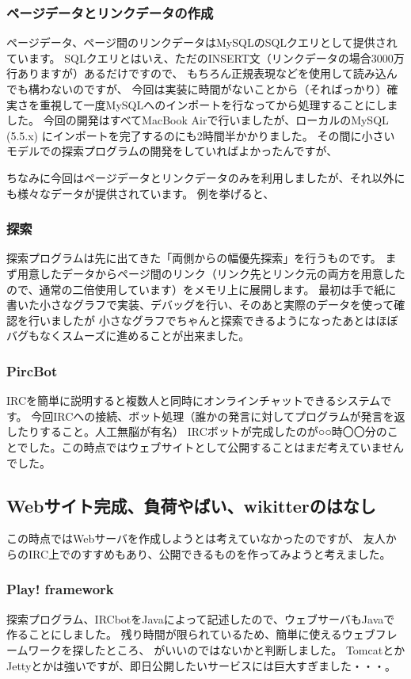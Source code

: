 \documentclass{jsarticle}
\begin{document}
\subsubsection{ページデータとリンクデータの作成}
ページデータ、ページ間のリンクデータはMySQLのSQLクエリとして提供されています。
SQLクエリとはいえ、ただのINSERT文（リンクデータの場合3000万行ありますが）あるだけですので、
もちろん正規表現などを使用して読み込んでも構わないのですが、
今回は実装に時間がないことから（そればっかり）確実さを重視して一度MySQLへのインポートを行なってから処理することにしました。
今回の開発はすべてMacBook Airで行いましたが、ローカルのMySQL (5.5.x) にインポートを完了するのにも2時間半かかりました。
その間に小さいモデルでの探索プログラムの開発をしていればよかったんですが、

ちなみに今回はページデータとリンクデータのみを利用しましたが、それ以外にも様々なデータが提供されています。
例を挙げると、

\subsubsection{探索}
探索プログラムは先に出てきた「両側からの幅優先探索」を行うものです。
まず用意したデータからページ間のリンク（リンク先とリンク元の両方を用意したので、通常の二倍使用しています）をメモリ上に展開します。
最初は手で紙に書いた小さなグラフで実装、デバッグを行い、そのあと実際のデータを使って確認を行いましたが
小さなグラフでちゃんと探索できるようになったあとはほぼバグもなくスムーズに進めることが出来ました。
\subsubsection{PircBot}
IRCを簡単に説明すると複数人と同時にオンラインチャットできるシステムです。
今回IRCへの接続、ボット処理（誰かの発言に対してプログラムが発言を返したりすること。人工無脳が有名）
IRCボットが完成したのが○○時〇〇分のことでした。この時点ではウェブサイトとして公開することはまだ考えていませんでした。

\subsection{Webサイト完成、負荷やばい、wikitterのはなし}
この時点ではWebサーバを作成しようとは考えていなかったのですが、
友人からのIRC上でのすすめもあり、公開できるものを作ってみようと考えました。

\subsubsection{Play! framework}
探索プログラム、IRCbotをJavaによって記述したので、ウェブサーバもJavaで作ることにしました。
残り時間が限られているため、簡単に使えるウェブフレームワークを探したところ、
がいいのではないかと判断しました。
TomcatとかJettyとかは強いですが、即日公開したいサービスには巨大すぎました・・・。
\end{document}
